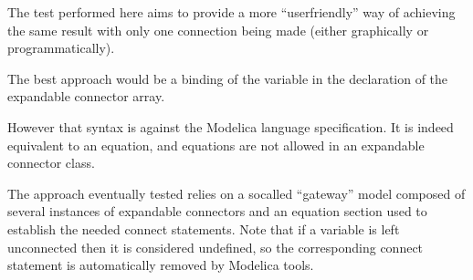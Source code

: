\documentclass[letterpaper,10pt, openany,english]{sphinxmanual}
\begin{document}
The test performed here aims to provide a more “user\sphinxhyphen{}friendly” way of achieving the same result with only one connection being made (either graphically or programmatically).

The best approach would be a binding of the variable in the declaration of the expandable connector array.

\begin{sphinxVerbatim}[commandchars=\\\{\}]
  
     
    
    \PYG{p}{[}\PYG{p}{]}
           
 
\end{sphinxVerbatim}

However that syntax is against the Modelica language specification.
It is indeed equivalent to an equation, and equations are not allowed in an expandable connector class.

The approach eventually tested relies on a so\sphinxhyphen{}called “gateway” model composed of several instances of expandable connectors and an equation section used to establish the needed connect statements. Note that if a variable is left unconnected then it is considered undefined, so the corresponding connect statement is automatically removed by Modelica tools.

\begin{sphinxVerbatim}[commandchars=\\\{\}]
 
     
    
    \PYG{p}{[}\PYG{p}{]}
       
       \PYG{p}{[}\PYG{p}{]}
    
    
 
\end{sphinxVerbatim}
\end{document}
